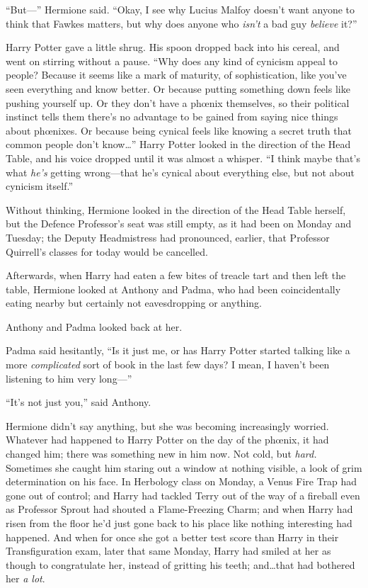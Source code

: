 “But—” Hermione said. “Okay, I see why Lucius Malfoy doesn’t want anyone to think that Fawkes matters, but why does anyone who \emph{isn’t} a bad guy \emph{believe} it?”

Harry Potter gave a little shrug. His spoon dropped back into his cereal, and went on stirring without a pause. “Why does any kind of cynicism appeal to people? Because it seems like a mark of maturity, of sophistication, like you’ve seen everything and know better. Or because putting something down feels like pushing yourself up. Or they don’t have a phœnix themselves, so their political instinct tells them there’s no advantage to be gained from saying nice things about phœnixes. Or because being cynical feels like knowing a secret truth that common people don’t know…” Harry Potter looked in the direction of the Head Table, and his voice dropped until it was almost a whisper. “I think maybe that’s what \emph{he’s} getting wrong—that he’s cynical about everything else, but not about cynicism itself.”

Without thinking, Hermione looked in the direction of the Head Table herself, but the Defence Professor’s seat was still empty, as it had been on Monday and Tuesday; the Deputy Headmistress had pronounced, earlier, that Professor Quirrell’s classes for today would be cancelled.

Afterwards, when Harry had eaten a few bites of treacle tart and then left the table, Hermione looked at Anthony and Padma, who had been coincidentally eating nearby but certainly not eavesdropping or anything.

Anthony and Padma looked back at her.

Padma said hesitantly, “Is it just me, or has Harry Potter started talking like a more \emph{complicated} sort of book in the last few days? I mean, I haven’t been listening to him very long—”

“It’s not just you,” said Anthony.

Hermione didn’t say anything, but she was becoming increasingly worried. Whatever had happened to Harry Potter on the day of the phœnix, it had changed him; there was something new in him now. Not cold, but \emph{hard.} Sometimes she caught him staring out a window at nothing visible, a look of grim determination on his face. In Herbology class on Monday, a Venus Fire Trap had gone out of control; and Harry had tackled Terry out of the way of a fireball even as Professor Sprout had shouted a Flame-Freezing Charm; and when Harry had risen from the floor he’d just gone back to his place like nothing interesting had happened. And when for once she got a better test score than Harry in their Transfiguration exam, later that same Monday, Harry had smiled at her as though to congratulate her, instead of gritting his teeth; and…that had bothered her \emph{a lot}.

